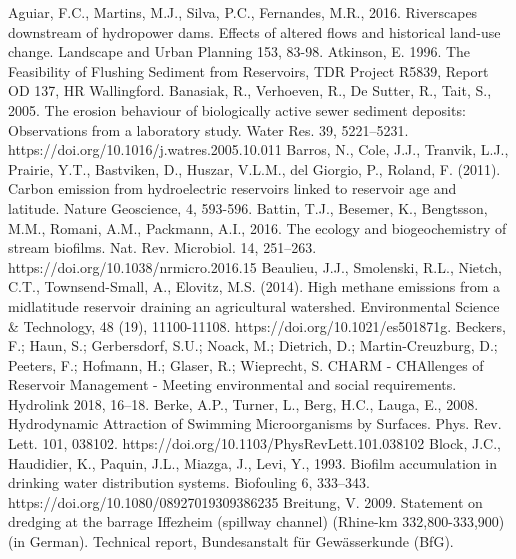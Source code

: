 
\begin{thebibliography}{}
%
%
Aguiar, F.C., Martins, M.J., Silva, P.C., Fernandes, M.R., 2016. Riverscapes downstream of hydropower dams. Effects of altered flows and historical land-use change. Landscape and Urban Planning 153, 83-98.
Atkinson, E. 1996. The Feasibility of Flushing Sediment from Reservoirs, TDR Project R5839, Report OD 137, HR Wallingford.
Banasiak, R., Verhoeven, R., De Sutter, R., Tait, S., 2005. The erosion behaviour of biologically active sewer sediment deposits: Observations from a laboratory study. Water Res. 39, 5221–5231. https://doi.org/10.1016/j.watres.2005.10.011
Barros, N., Cole, J.J., Tranvik, L.J., Prairie, Y.T., Bastviken, D., Huszar, V.L.M., del Giorgio, P., Roland, F. (2011). Carbon emission from hydroelectric reservoirs linked to reservoir age and latitude. Nature Geoscience, 4, 593-596.
Battin, T.J., Besemer, K., Bengtsson, M.M., Romani, A.M., Packmann, A.I., 2016. The ecology and biogeochemistry of stream biofilms. Nat. Rev. Microbiol. 14, 251–263. https://doi.org/10.1038/nrmicro.2016.15
Beaulieu, J.J., Smolenski, R.L., Nietch, C.T., Townsend-Small, A., Elovitz, M.S. (2014). High methane emissions from a midlatitude reservoir draining an agricultural watershed. Environmental Science & Technology, 48 (19), 11100-11108. https://doi.org/10.1021/es501871g.
Beckers, F.; Haun, S.; Gerbersdorf, S.U.; Noack, M.; Dietrich, D.; Martin-Creuzburg, D.; Peeters, F.; Hofmann, H.; Glaser, R.; Wieprecht, S. CHARM - CHAllenges of Reservoir Management - Meeting environmental and social requirements. Hydrolink 2018, 16–18.
Berke, A.P., Turner, L., Berg, H.C., Lauga, E., 2008. Hydrodynamic Attraction of Swimming Microorganisms by Surfaces. Phys. Rev. Lett. 101, 038102. https://doi.org/10.1103/PhysRevLett.101.038102
Block, J.C., Haudidier, K., Paquin, J.L., Miazga, J., Levi, Y., 1993. Biofilm accumulation in drinking water distribution systems. Biofouling 6, 333–343. https://doi.org/10.1080/08927019309386235
Breitung, V. 2009. Statement on dredging at the barrage Iffezheim (spillway channel) (Rhine-km 332,800-333,900) (in German). Technical report, Bundesanstalt für Gewässerkunde (BfG).

\end{thebibliography}
